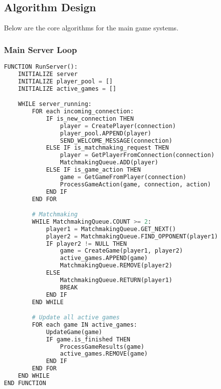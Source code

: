 \documentclass{article}
\begin{document}
\subsection{Algorithm Design}

Below are the core algorithms for the main game systems.

\subsubsection{Main Server Loop}
\begin{lstlisting}[language=Python, caption=Main Server Loop]
FUNCTION RunServer():
    INITIALIZE server
    INITIALIZE player_pool = []
    INITIALIZE active_games = []

    WHILE server_running:
        FOR each incoming_connection:
            IF is_new_connection THEN
                player = CreatePlayer(connection)
                player_pool.APPEND(player)
                SEND_WELCOME_MESSAGE(connection)
            ELSE IF is_matchmaking_request THEN
                player = GetPlayerFromConnection(connection)
                MatchmakingQueue.ADD(player)
            ELSE IF is_game_action THEN
                game = GetGameFromPlayer(connection)
                ProcessGameAction(game, connection, action)
            END IF
        END FOR

        # Matchmaking
        WHILE MatchmakingQueue.COUNT >= 2:
            player1 = MatchmakingQueue.GET_NEXT()
            player2 = MatchmakingQueue.FIND_OPPONENT(player1)
            IF player2 != NULL THEN
                game = CreateGame(player1, player2)
                active_games.APPEND(game)
                MatchmakingQueue.REMOVE(player2)
            ELSE
                MatchmakingQueue.RETURN(player1)
                BREAK
            END IF
        END WHILE

        # Update all active games
        FOR each game IN active_games:
            UpdateGame(game)
            IF game.is_finished THEN
                ProcessGameResults(game)
                active_games.REMOVE(game)
            END IF
        END FOR
    END WHILE
END FUNCTION
\end{lstlisting}

\FloatBarrier

\end{document}
